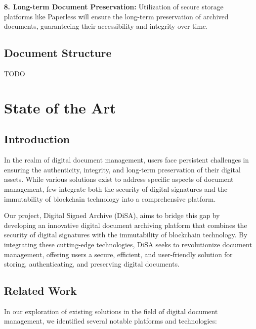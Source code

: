 \documentclass[a4paper,11pt]{article}
\begin{document}
        \textbf{8. Long-term Document Preservation:}
        Utilization of secure storage platforms like Paperless will ensure the long-term preservation of archived documents, guaranteeing their accessibility and integrity over time.
        
    \vspace{0.5cm}
    \subsection{Document Structure}
        TODO

    \clearpage %
    \section{State of the Art}\label{sec:soa}
    
    \subsection{Introduction}
        In the realm of digital document management, users face persistent challenges in ensuring the authenticity, integrity, and long-term preservation of their digital assets. While various solutions exist to address specific aspects of document management, few integrate both the security of digital signatures and the immutability of blockchain technology into a comprehensive platform.
    
        Our project, Digital Signed Archive (DiSA), aims to bridge this gap by developing an innovative digital document archiving platform that combines the security of digital signatures with the immutability of blockchain technology. By integrating these cutting-edge technologies, DiSA seeks to revolutionize document management, offering users a secure, efficient, and user-friendly solution for storing, authenticating, and preserving digital documents.
        
    \vspace{0.5cm}
    \subsection{Related Work}
        In our exploration of existing solutions in the field of digital document management, we identified several notable platforms and technologies:
    
\end{document}

